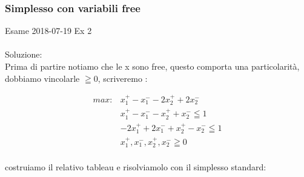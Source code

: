 \documentclass{article}
\begin{document}
\subsubsection{Simplesso con variabili free}
Esame 2018-07-19 Ex 2\\
\noindent{}%
\\
Soluzione: \\
Prima di partire notiamo che le x sono free, questo comporta una particolarità, dobbiamo vincolarle $\geqq 0$, scriveremo :\\
\begin{center}
\begin{align*}
max: &x_1^+ - x_1^- -2x_2^+ + 2x_2^-\\
&x_1^+ -x_1^- - x_2^+ + x_2^- \leqq 1\\
&-2x_1^+ + 2x_1^- + x_2^+ -x_2^- \leqq 1\\
&x_1^+ ,x_1^-,x_2^+,x_2^- \geqq 0\\
\end{align*}
\end{center}

costruiamo il relativo tableau e risolviamolo con il simplesso standard:\\

\begin{center}
\end{center}
\end{document}
